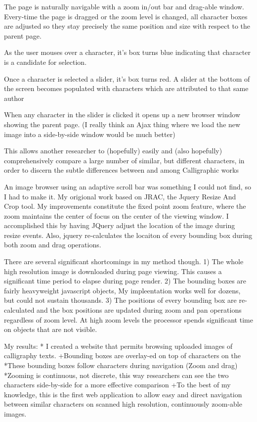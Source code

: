                 The page is naturally navigable with a zoom in/out bar and drag-able window.
                Every-time the page is dragged or the zoom level is changed, all character boxes are adjusted so they stay precisely the same position and size with respect to the parent page.
                
                As the user mouses over a character, it's box turns blue indicating that character is a candidate for selection.
                
                Once a character is selected a slider, it's box turns red. A slider at the bottom of the screen becomes populated with characters which are attributed to that same author
                
                When any character in the slider is clicked it opens up a new browser window showing the parent page.  (I really think an Ajax thing where we load the new image into a side-by-side window would be much better)
                
                This allows another researcher to (hopefully) easily and (also hopefully) comprehensively compare a large number of similar, but different characters, in order to discern the subtle differences between and among Calligraphic works
                
                An image browser using an adaptive scroll bar was something I could not find, so I had to make it.  My origional work based on JRAC, the Jquery Resize And Crop tool.  My improvements constitute the fixed point zoom feature, where the zoom maintains the center of focus on the center of the viewing window.  I accomplished this by having JQuery adjust the location of the image during resize events.  Also, jquery re-calculates the locaiton of every bounding box during both zoom and drag operations.
                
                There are several significant shortcomings in my method though.
                1)  The whole high resolution image is downloaded during page viewing. This causes a significant time period to elapse during page render.
                2)  The bounding boxes are fairly heavyweight javascript objects, My impleentation works well for dozens, but could not sustain thousands.
                3)  The positions of every bounding box are re-calculated and the box positions are updated during zoom and pan operations regardless of zoom level.  At high zoom levels the processor spends significant time on objects that are not visible.
                
                
                    My results:
        *  I created a website that permits browsing uploaded images of calligraphy texts.
            +Bounding boxes are overlay-ed on top of characters on the 
                *These bounding boxes follow characters during navigation (Zoom and drag)
                *Zooming is continuous, not discrete, this way researchers can see the two characters side-by-side for a more effective comparison
            +To the best of my knowledge, this is the first web application to allow easy and direct navigation between similar characters on scanned high resolution, continuously zoom-able images.
            

